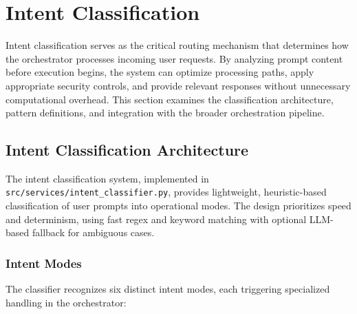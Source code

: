 
\section{Intent Classification}
\label{sec:intent-classification}

Intent classification serves as the critical routing mechanism that determines how the orchestrator processes incoming user requests. By analyzing prompt content before execution begins, the system can optimize processing paths, apply appropriate security controls, and provide relevant responses without unnecessary computational overhead. This section examines the classification architecture, pattern definitions, and integration with the broader orchestration pipeline.

\subsection{Intent Classification Architecture}

The intent classification system, implemented in \texttt{src/services/intent\_classifier.py}, provides lightweight, heuristic-based classification of user prompts into operational modes. The design prioritizes speed and determinism, using fast regex and keyword matching with optional LLM-based fallback for ambiguous cases.

\subsubsection{Intent Modes}

The classifier recognizes six distinct intent modes, each triggering specialized handling in the orchestrator:

